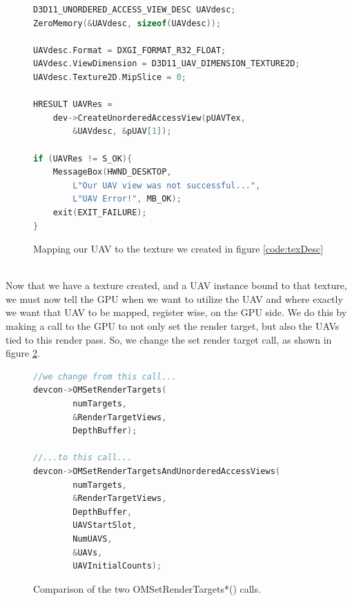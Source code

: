 \documentclass[a4paper, 12pt]{article}
\begin{document}

\begin{figure}[h]
\begin{lstlisting}[language=C++]
D3D11_UNORDERED_ACCESS_VIEW_DESC UAVdesc;
ZeroMemory(&UAVdesc, sizeof(UAVdesc));

UAVdesc.Format = DXGI_FORMAT_R32_FLOAT;
UAVdesc.ViewDimension = D3D11_UAV_DIMENSION_TEXTURE2D;
UAVdesc.Texture2D.MipSlice = 0;

HRESULT UAVRes = 
	dev->CreateUnorderedAccessView(pUAVTex, 
		&UAVdesc, &pUAV[1]);

if (UAVRes != S_OK){
	MessageBox(HWND_DESKTOP, 
		L"Our UAV view was not successful...", 
		L"UAV Error!", MB_OK);
	exit(EXIT_FAILURE);
}
\end{lstlisting}
\caption{Mapping our UAV to the texture we created in figure \ref{code:texDesc}}
\label{code:mapUAVtoTex}
\end{figure}

\noindent \\ Now that we have a texture created, and a UAV instance bound
to that texture, we must now tell the GPU when we want to utilize the UAV and
where exactly we want that UAV to be mapped, register wise, on the GPU side.
We do this by making a call to the GPU to not only set the render target, but
also the UAVs tied to this render pass. So, we change the set render target
call, as shown in figure \ref{code:setRTV}.

\begin{figure}[h]
\begin{lstlisting}[language=C++]
//we change from this call...
devcon->OMSetRenderTargets(
		numTargets, 
		&RenderTargetViews, 
		DepthBuffer);

//...to this call...
devcon->OMSetRenderTargetsAndUnorderedAccessViews(
		numTargets,
		&RenderTargetViews,
		DepthBuffer,
		UAVStartSlot,
		NumUAVS,
		&UAVs,
		UAVInitialCounts);
\end{lstlisting}
\caption{Comparison of the two OMSetRenderTargets*() calls.}
\label{code:setRTV}
\end{figure}
\end{document}

